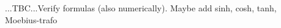 \documentclass[12pt]{article}
\begin{document}
...TBC...Verify formulas (also numerically). Maybe add sinh, cosh, tanh, Moebius-trafo \newline

\end{document}
